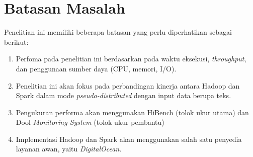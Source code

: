 
\section{Batasan Masalah}
Penelitian ini memiliki beberapa batasan yang perlu diperhatikan sebagai berikut:
	\begin{enumerate}
		\item Perfoma pada penelitian ini berdasarkan pada waktu eksekusi, \textit{throughput}, dan penggunaan sumber daya (CPU, memori, I/O).
		\item Penelitian ini akan fokus pada perbandingan kinerja antara Hadoop dan Spark dalam mode \textit{pseudo-distributed} dengan input data berupa teks.
		\item Pengukuran performa akan menggunakan HiBench (tolok ukur utama) dan Dool \textit{Monitoring System} (tolok ukur pembantu) 
		\item Implementasi Hadoop dan Spark akan menggunakan salah satu penyedia layanan awan, yaitu \textit{DigitalOcean}.
	\end{enumerate}

%
%
%
